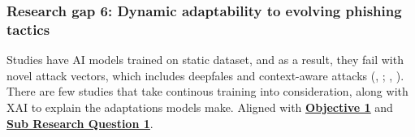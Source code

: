 
\subsubsection*{Research gap 6: Dynamic adaptability to evolving phishing tactics}\label{research-gap-6}
Studies have AI models trained on static dataset, and as a result, they fail with novel attack vectors, which includes deepfales and context-aware attacks (\citeauthor{kapoor2024comparative}, \citeyear{kapoor2024comparative}; \citeauthor{atlam2022business}, \citeyear{atlam2022business}). There are few studies that take continous training into consideration, along with XAI to explain the adaptations models make. Aligned with \hyperref[objective-1]{\uline{\textbf{Objective 1}}} and \hyperref[sub-research-q1]{\uline{\textbf{Sub Research Question 1}}}.
